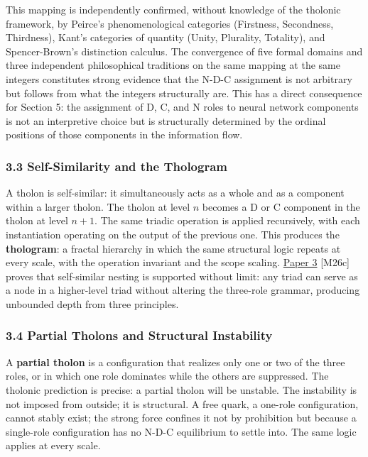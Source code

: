 \documentclass[
  11pt,
  letterpaper,
]{article}
\begin{document}
This mapping is independently confirmed, without knowledge of the
tholonic framework, by Peirce's phenomenological categories (Firstness,
Secondness, Thirdness), Kant's categories of quantity (Unity, Plurality,
Totality), and Spencer-Brown's distinction calculus. The convergence of
five formal domains and three independent philosophical traditions on
the same mapping at the same integers constitutes strong evidence that
the N-D-C assignment is not arbitrary but follows from what the integers
structurally are. This has a direct consequence for Section 5: the
assignment of D, C, and N roles to neural network components is not an
interpretive choice but is structurally determined by the ordinal
positions of those components in the information flow.

\subsubsection{3.3 Self-Similarity and the
Thologram}\label{self-similarity-and-the-thologram}

A tholon is self-similar: it simultaneously acts as a whole and as a
component within a larger tholon. The tholon at level \(n\) becomes a D
or C component in the tholon at level \(n+1\). The same triadic
operation is applied recursively, with each instantiation operating on
the output of the previous one. This produces the \textbf{thologram}: a
fractal hierarchy in which the same structural logic repeats at every
scale, with the operation invariant and the scope scaling.
\href{https://github.com/baardev/truevalue/blob/main/docnav/Research/papers/3_minimal-recursive-triadic-framework/3_minimal-recursive-triadic-framework.pdf}{Paper
3} {[}M26c{]} proves that self-similar nesting is supported without
limit: any triad can serve as a node in a higher-level triad without
altering the three-role grammar, producing unbounded depth from three
principles.

\subsubsection{3.4 Partial Tholons and Structural
Instability}\label{partial-tholons-and-structural-instability}

A \textbf{partial tholon} is a configuration that realizes only one or
two of the three roles, or in which one role dominates while the others
are suppressed. The tholonic prediction is precise: a partial tholon
will be unstable. The instability is not imposed from outside; it is
structural. A free quark, a one-role configuration, cannot stably exist;
the strong force confines it not by prohibition but because a
single-role configuration has no N-D-C equilibrium to settle into. The
same logic applies at every scale.
\end{document}
